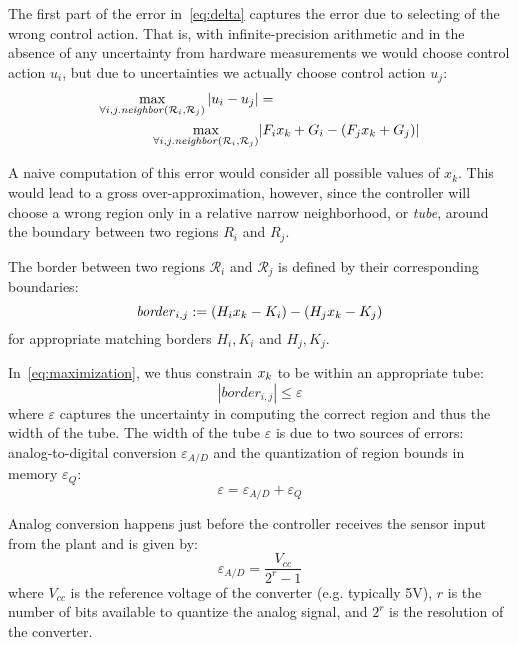 The first part of the error in~\autoref{eq:delta} captures the error due to
selecting of the wrong control action. That is, with infinite-precision arithmetic
and in the absence of any uncertainty from hardware measurements we would choose
control action $u_i$, but due to uncertainties we actually choose control action $u_j$:
\begin{align} \label{eq:maximization}
  \max_{\forall i,j.\mathit{neighbor}(\mathcal{R}_{i},\mathcal{R}_{j})}|u_{i}-u_{j}|&= \\
  \max_{\forall i,j.\mathit{neighbor}(\mathcal{R}_{i},\mathcal{R}_{j})}&|F_{i}x_{k}+G_{i} - (F_{j}x_{k}+G_{j})|\nonumber
\end{align}


A naive computation of this error would consider all possible values of $x_k$.
This would lead to a gross over-approximation, however, since the controller
will choose a wrong region only in a relative narrow neighborhood, or
\emph{tube}, around the boundary between two regions $R_i$ and $R_j$.

The border between two regions $\mathcal{R}_{i}$ and $\mathcal{R}_{j}$ is defined by 
their corresponding boundaries:
\begin{equation}
\mathit{border}_{i,j} :=(H_i x_{k} - K_i ) - (H_j x_{k} - K_j)
\end{equation}
for appropriate matching borders $H_i, K_i$ and $H_j, K_j$.

In~\autoref{eq:maximization}, we thus constrain $x_{k}$ to be within an appropriate tube:
\begin{equation}\label{eq:tube}
|\mathit{border}_{i,j}| \le \varepsilon
\end{equation}
where $\varepsilon$ captures the uncertainty in computing the
correct region and thus the width of the tube.
%
The width of the tube $\varepsilon$ is due to two sources of errors:
analog-to-digital conversion $\varepsilon_{A/D}$ and the quantization of region
bounds in memory $\varepsilon_{Q}$:
\begin{equation}\label{eq:epsilontot}
  \varepsilon=\varepsilon_{A/D}+\varepsilon_{Q}
\end{equation}

Analog conversion happens just before the controller receives the sensor input from the plant
and is given by:
\begin{equation*}
\varepsilon_{A/D}=\frac{V_{cc}}{2^{r}-1}
\end{equation*}
where $V_{cc}$ is the reference voltage of the converter (e.g. typically 5V), $r$
is the number of bits available to quantize the analog signal, and $2^{r}$ is
the resolution of the converter.

